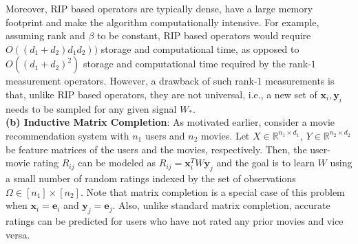 \documentclass[11pt]{article}
\newcommand{\e}{\bm{e}}
\newcommand{\tp}[1]{{#1}^{T}}
\newcommand{\Wo}{W_*}
\newcommand{\x}{\bm{x}}
\newcommand{\y}{\bm{y}}
\begin{document}
Moreover, RIP based operators are typically dense, have a large memory footprint and make the algorithm computationally intensive. For example, assuming rank and $\beta$ to be constant, RIP based operators would require $O((d_1+d_2)d_1d_2))$ storage and computational time, as opposed to $O((d_1+d_2)^2)$ storage and computational time required by the rank-$1$ measurement operators. %
 However, a drawback of such rank-$1$ measurements is that, unlike RIP based operators, they are not universal, i.e., a new set of $\x_i, \y_i$ needs to be sampled for any given signal $\Wo$. \\[8pt]%
{\bf (b) Inductive Matrix Completion}: As motivated earlier, consider a movie recommendation system with $n_1$ users and $n_2$ movies. Let $X\in \mathbb{R}^{n_1\times d_1},\ Y\in \mathbb{R}^{n_2\times d_2}$ be feature matrices of the users and the movies, respectively. Then, the user-movie rating $R_{ij}$ can be modeled as $R_{ij}=\tp{\x}_iW\y_j$ and the goal is to learn $W$ using a small number of random ratings indexed by the set of observations $\Omega \in [n_1]\times [n_2]$. Note that matrix completion is a special case of this problem when $\x_i=\e_i$ and $\y_j=\e_j$. Also, unlike standard matrix completion, accurate ratings can be predicted for users who have not rated any prior movies and vice versa. 
\end{document}
